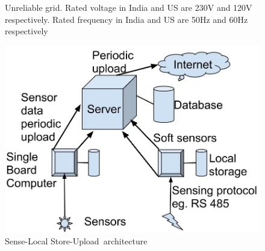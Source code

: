 \documentclass[10pt]{sensys-proc}
\newcommand{\paradigm}{Sense-Local Store-Upload}
\newcommand{\paradigms}{Sense-Local Store-Upload~}
\begin{document}
\begin{figure}[t!]
                            
     \vspace{-3mm}
   
    \caption{Unreliable grid. Rated voltage in India and US are 230V and 120V respectively. Rated frequency in India and US are 50Hz and 60Hz respectively}

    \label{fig:unreliable}

\end{figure}

%   

\begin{figure}

\centering \includegraphics[scale=0.13]{./figures/architecture.jpg}
\vspace{-2mm}
\caption{\paradigms architecture}
\vspace{-2mm}
\label{fig:architecture}
\end{figure}
\end{document}

